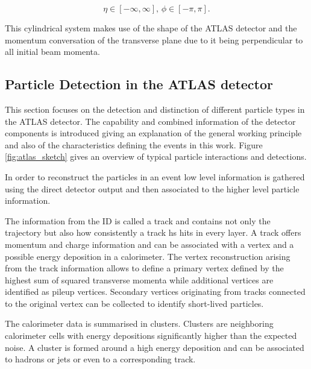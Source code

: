 \begin{equation}
\eta \in [-\infty,\infty],\,
\phi \in [-\pi,\pi].
\end{equation}

This cylindrical system makes use of the shape of the ATLAS detector and the momentum conversation of the transverse plane due to it being perpendicular to all initial beam momenta.

\subsection{Particle Detection in the ATLAS detector}

This section focuses on the detection and distinction of different particle types in the ATLAS detector. The capability and combined information of the detector components is introduced giving an explanation of the general working principle and also of the characteristics defining the events in this work. Figure \ref{fig:atlas_sketch} gives an overview of typical particle interactions and detections.

In order to reconstruct the particles in an event low level information is gathered using the direct detector output and then associated to the higher level particle information.

The information from the ID is called a track and contains not only the trajectory but also how consistently a track hs hits in every layer. A track offers momentum and charge information and can be associated with a vertex and a possible energy deposition in a calorimeter. 
The vertex reconstruction arising from the track information allows to define a primary vertex defined by the highest sum of squared transverse momenta while additional vertices are identified as pileup vertices.
Secondary vertices originating from tracks connected to the original vertex can be collected to identify short-lived particles.

The calorimeter data is summarised in clusters. Clusters are neighboring calorimeter cells with energy depositions significantly higher than the expected noise. A cluster is formed around a high energy deposition and can be associated to hadrons or jets or even to a corresponding track.



